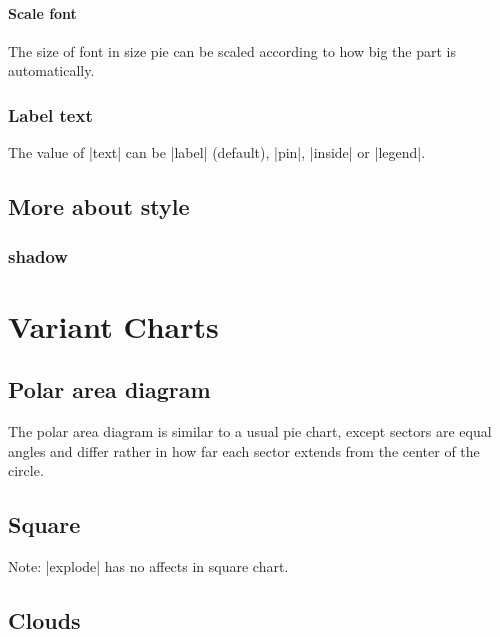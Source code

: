 \documentclass{ltxdoc}
\begin{document}
\paragraph{Scale font}
The size of font in size pie can be scaled according to how big the
part is automatically.

\codeexample[scale=0.25,from file={demo/scalefont.tex}]

\subsubsection{Label text}
The value of |text| can be |label| (default),
|pin|, |inside| or |legend|.

\codeexample[scale=0.25,from file={demo/text.tex}]

\codeexample[scale=0.25,from file={demo/text-inside.tex}]

\codeexample[scale=0.25,from file={demo/legend.tex}]

\subsection{More about style}
\subsubsection{shadow}
\codeexample[scale=0.25,from file={demo/shadow.tex}]

\section{Variant Charts}
\subsection{Polar area diagram}
The polar area diagram is similar to a usual pie chart, except sectors
are equal angles and differ rather in how far each sector extends from
the center of the circle.

\codeexample[scale=0.25,from file={demo/polar.tex}]

\subsection{Square}

\codeexample[scale=0.25,from file={demo/square.tex}]

Note: |explode| has no affects in square chart.

\subsection{Clouds}
\end{document}
